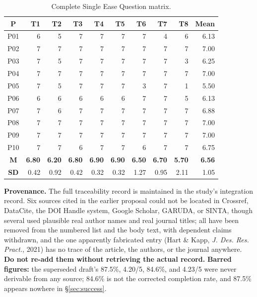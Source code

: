 \documentclass[conference]{IEEEtran}
\begin{document}
\begin{table}[!t]
\centering
\caption{Complete Single Ease Question matrix.}
\label{tab:seq}
\scriptsize
\setlength{\tabcolsep}{2.6pt}
\begin{tabular}{@{}c|rrrrrrrr|r@{}}
\toprule
\textbf{P} & \textbf{T1} & \textbf{T2} & \textbf{T3} & \textbf{T4} &
\textbf{T5} & \textbf{T6} & \textbf{T7} & \textbf{T8} & \textbf{Mean} \\
\midrule
P01 & 6 & 5 & 7 & 7 & 7 & 7 & 4 & 6 & 6.13 \\
P02 & 7 & 7 & 7 & 7 & 7 & 7 & 7 & 7 & 7.00 \\
P03 & 7 & 5 & 7 & 7 & 7 & 7 & 7 & 3 & 6.25 \\
P04 & 7 & 7 & 7 & 7 & 7 & 7 & 7 & 7 & 7.00 \\
P05 & 7 & 5 & 7 & 7 & 7 & 3 & 7 & 1 & 5.50 \\
P06 & 6 & 6 & 6 & 6 & 6 & 7 & 7 & 5 & 6.13 \\
P07 & 7 & 6 & 7 & 7 & 7 & 7 & 7 & 7 & 6.88 \\
P08 & 7 & 7 & 7 & 7 & 7 & 7 & 7 & 7 & 7.00 \\
P09 & 7 & 7 & 7 & 7 & 7 & 7 & 7 & 7 & 7.00 \\
P10 & 7 & 7 & 6 & 7 & 7 & 6 & 7 & 7 & 6.75 \\
\midrule
\textbf{M} & \textbf{6.80} & \textbf{6.20} & \textbf{6.80} &
\textbf{6.90} & \textbf{6.90} & \textbf{6.50} & \textbf{6.70} &
\textbf{5.70} & \textbf{6.56} \\
\textbf{SD} & 0.42 & 0.92 & 0.42 & 0.32 & 0.32 & 1.27 & 0.95 & 2.11 &
1.05 \\
\bottomrule
\end{tabular}
\end{table}

\textbf{Provenance.} The full traceability record is maintained in the
study's integration record. Six sources cited in the earlier proposal could
not be located in Crossref, DataCite, the DOI Handle system, Google
Scholar, GARUDA, or SINTA, though several used plausible real author names
and real journal titles; all have been removed from the numbered list and
the body text, with dependent claims withdrawn, and the one apparently
fabricated entry (Hart \& Kapp, \emph{J. Des. Res. Pract.}, 2021) has no
trace of the article, the authors, or the journal anywhere. \textbf{Do not
re-add them without retrieving the actual record.} \textbf{Barred figures:}
the superseded draft's 87.5\%, 4.20/5, 84.6\%, and 4.23/5 were never
derivable from any source; 84.6\% is not the corrected completion rate, and
87.5\% appears nowhere in \S\ref{sec:success}.
\end{document}

